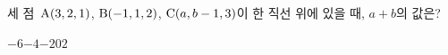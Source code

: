 세 점~$\mathrm{A}(3{,}\mkern3mu\mathopen{}2{,}\mkern3mu\mathopen{}1)$, $\mathrm{B}(-1{,}\mkern3mu\mathopen{}1{,}\mkern3mu\mathopen{}2)$, $\mathrm{C}(a{,}\mkern3mu\mathopen{}b-1{,}\mkern3mu\mathopen{}3)$이 한 직선 위에 있을 때, $a+b$의 값은?
\begin{choices32}{$-6$}{$-4$}{$-2$}{$0$}{$2$}\end{choices32}
